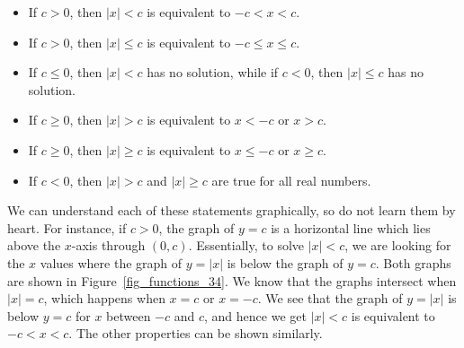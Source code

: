 \begin{itemize}

\item  If $c > 0$, then $|x| < c$ is equivalent to $-c<x<c$.

\item  If $c > 0$, then $|x| \leq c$ is equivalent to $-c \leq x \leq c$.

\item  If $c \leq 0$, then $|x| < c$ has no solution, while if $c < 0$, then $|x| \leq c$ has no solution.

\item  If $c \geq 0$, then $|x| > c$ is equivalent to $x<-c$ or $x>c$.

\item  If $c \geq 0$, then $|x| \geq c$ is equivalent to $x \leq -c$ or $x \geq c$.

\item  If $c < 0$, then $|x| > c$ and $|x| \geq c$ are true for all real numbers.

\end{itemize}

	\checkoddpage
{}





We can understand each of these statements graphically, so do not learn them by heart.  For instance, if $c > 0$, the graph of $y=c$ is a horizontal line which lies above the $x$-axis through $(0,c)$.  Essentially, to solve $|x| < c$, we are looking for the $x$ values where the graph of $y=|x|$ is below the graph of $y=c$. Both graphs are shown in Figure~\ref{fig_functions_34}. We know that the graphs intersect when $|x|=c$, which happens when $x=c$ or $x=-c$. We see that the graph of $y=|x|$ is below $y=c$ for $x$ between $-c$ and $c$, and hence we get $|x| < c$ is equivalent to $-c < x < c$.  The other properties can be shown similarly.

